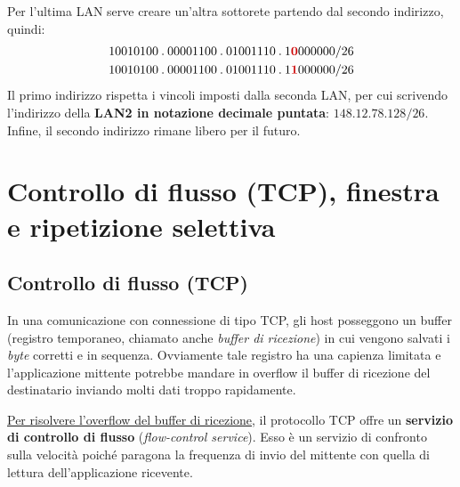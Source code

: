 \documentclass[a4paper]{article}
\newcommand{\binaryaddresspointed}[4]{#1\:.\:#2\:.\:#3\:.\:#4}
\begin{document}
	\noindent
	Per l’ultima LAN serve creare un’altra sottorete partendo dal secondo indirizzo, quindi:
	\begin{gather*}
		\binaryaddresspointed{10010100}{00001100}{01001110}{1\textcolor{Red3}{\boldsymbol{0}}000000}/26 \\
		\binaryaddresspointed{10010100}{00001100}{01001110}{1\textcolor{Red3}{\boldsymbol{1}}000000}/26
	\end{gather*}
	Il primo indirizzo rispetta i vincoli imposti dalla seconda LAN, per cui scrivendo l’indirizzo della \textbf{LAN2 in notazione decimale puntata}: $148.12.78.128/26$.\newline
	Infine, il secondo indirizzo rimane libero per il futuro.
	
	\newpage
	
	\section{Controllo di flusso (TCP), finestra e ripetizione selettiva}
	
	\subsection{Controllo di flusso (TCP)}
	
	In una comunicazione con connessione di tipo TCP, gli host posseggono un buffer (registro temporaneo, chiamato anche \emph{buffer di ricezione}) in cui vengono salvati i \emph{byte} corretti e in sequenza. Ovviamente tale registro ha una capienza limitata e l’applicazione mittente potrebbe mandare in overflow il buffer di ricezione del destinatario inviando molti dati troppo rapidamente.\newline
	
	\noindent
	\underline{Per risolvere l’overflow del buffer di ricezione}, il protocollo TCP offre un \textcolor{Red3}{\textbf{servizio di controllo di flusso}} (\emph{flow-control service}). Esso è un servizio di confronto sulla velocità poiché paragona la frequenza di invio del mittente con quella di lettura dell’applicazione ricevente.\newline
	
	\noindent
	\newline
	\:\newline
	
\end{document}
